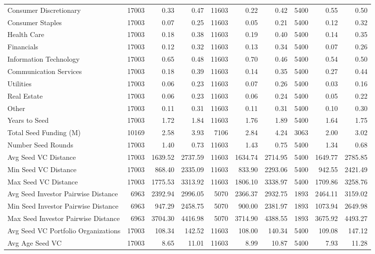 {\begin{table}[!h]
{\begin{tabular}[t]{lrrrrrrrrr}
Consumer Discretionary & 17003 & 0.33 & 0.47 & 11603 & 0.22 & 0.42 & 5400 & 0.55 & 0.50\\
Consumer Staples & 17003 & 0.07 & 0.25 & 11603 & 0.05 & 0.21 & 5400 & 0.12 & 0.32\\
Health Care & 17003 & 0.18 & 0.38 & 11603 & 0.19 & 0.40 & 5400 & 0.14 & 0.35\\
Financials & 17003 & 0.12 & 0.32 & 11603 & 0.13 & 0.34 & 5400 & 0.07 & 0.26\\
\addlinespace
Information Technology & 17003 & 0.65 & 0.48 & 11603 & 0.70 & 0.46 & 5400 & 0.54 & 0.50\\
Communication Services & 17003 & 0.18 & 0.39 & 11603 & 0.14 & 0.35 & 5400 & 0.27 & 0.44\\
Utilities & 17003 & 0.06 & 0.23 & 11603 & 0.07 & 0.26 & 5400 & 0.03 & 0.16\\
Real Estate & 17003 & 0.06 & 0.23 & 11603 & 0.06 & 0.24 & 5400 & 0.05 & 0.22\\
Other & 17003 & 0.11 & 0.31 & 11603 & 0.11 & 0.31 & 5400 & 0.10 & 0.30\\
\addlinespace
Years to Seed & 17003 & 1.72 & 1.84 & 11603 & 1.76 & 1.89 & 5400 & 1.64 & 1.75\\
Total Seed Funding (M) & 10169 & 2.58 & 3.93 & 7106 & 2.84 & 4.24 & 3063 & 2.00 & 3.02\\
Number Seed Rounds & 17003 & 1.40 & 0.73 & 11603 & 1.43 & 0.75 & 5400 & 1.34 & 0.68\\
Avg Seed VC Distance & 17003 & 1639.52 & 2737.59 & 11603 & 1634.74 & 2714.95 & 5400 & 1649.77 & 2785.85\\
Min Seed VC Distance & 17003 & 868.40 & 2335.09 & 11603 & 833.90 & 2293.06 & 5400 & 942.55 & 2421.49\\
\addlinespace
Max Seed VC Distance & 17003 & 1775.53 & 3313.92 & 11603 & 1806.10 & 3338.97 & 5400 & 1709.86 & 3258.76\\
Avg Seed Investor Pairwise Distance & 6963 & 2392.94 & 2996.05 & 5070 & 2366.37 & 2932.75 & 1893 & 2464.11 & 3159.02\\
Min Seed Investor Pairwise Distance & 6963 & 947.29 & 2458.75 & 5070 & 900.00 & 2381.97 & 1893 & 1073.94 & 2649.98\\
Max Seed Investor Pairwise Distance & 6963 & 3704.30 & 4416.98 & 5070 & 3714.90 & 4388.55 & 1893 & 3675.92 & 4493.27\\
Avg Seed VC Portfolio Organizations & 17003 & 108.34 & 142.52 & 11603 & 108.00 & 140.34 & 5400 & 109.08 & 147.12\\
\addlinespace
Avg Age Seed VC & 17003 & 8.65 & 11.01 & 11603 & 8.99 & 10.87 & 5400 & 7.93 & 11.28\\

\end{tabular}}
\end{table}}

